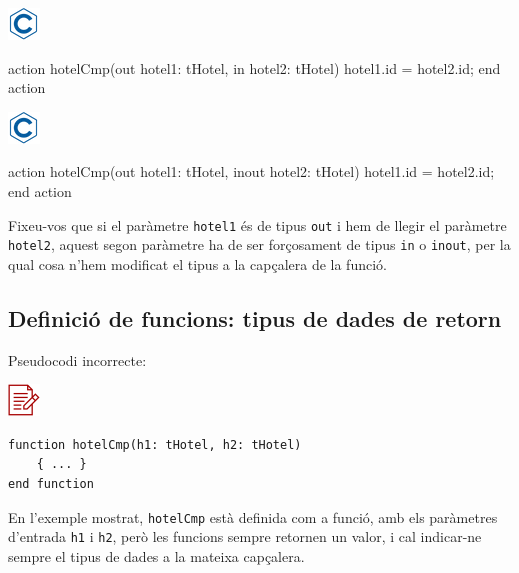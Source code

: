 \documentclass[
]{book}
\newenvironment{Shaded}{\begin{snugshade}}{\end{snugshade}}
\newcommand{\NormalTok}[1]{#1}
\begin{document}
\includegraphics{./img/c.png}

\begin{Shaded}
\begin{Highlighting}[]
\NormalTok{action hotelCmp(out hotel1: tHotel, in hotel2: tHotel)}
\NormalTok{    hotel1.id = hotel2.id;}
\NormalTok{end action}
\end{Highlighting}
\end{Shaded}

\includegraphics{./img/c.png}

\begin{Shaded}
\begin{Highlighting}[]
\NormalTok{action hotelCmp(out hotel1: tHotel, inout hotel2: tHotel)}
\NormalTok{    hotel1.id = hotel2.id;}
\NormalTok{end action}
\end{Highlighting}
\end{Shaded}

Fixeu-vos que si el paràmetre \texttt{hotel1} és de tipus \texttt{out} i hem de llegir el paràmetre \texttt{hotel2}, aquest segon paràmetre ha de ser forçosament de tipus \texttt{in} o \texttt{inout}, per la qual cosa n'hem modificat el tipus a la capçalera de la funció.

\hypertarget{definiciuxf3-de-funcions-tipus-de-dades-de-retorn}{%
\subsection{Definició de funcions: tipus de dades de retorn}\label{definiciuxf3-de-funcions-tipus-de-dades-de-retorn}}

Pseudocodi incorrecte:

\includegraphics{./img/alg_err.png}

\begin{verbatim}
function hotelCmp(h1: tHotel, h2: tHotel)
    { ... }
end function
\end{verbatim}

En l'exemple mostrat, \texttt{hotelCmp} està definida com a funció, amb els paràmetres d'entrada \texttt{h1} i \texttt{h2}, però les funcions sempre retornen un valor, i cal indicar-ne sempre el tipus de dades a la mateixa capçalera.
\end{document}
